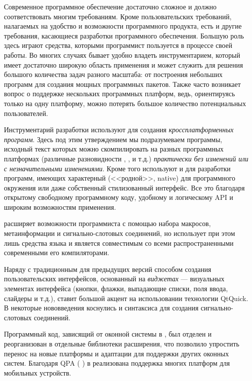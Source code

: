 Современное программное обеспечение достаточно сложное и должно соответствовать многим требованиям. 
Кроме пользовательских требований, налагаемых на удобство и возможности программного продукта, есть 
и другие требования, касающиеся разработки программного обеспечения. Большую роль здесь играют средства, 
которыми программист пользуется в
процессе своей работы. Во многих случаях бывает удобно владеть инструментарием, который имеет достаточно широкую
область применения и может служить для решения большого количества задач разного масштаба: от построения небольших
программ для создания мощных программных пакетов. Также часто возникает вопрос о поддержке нескольких программных
платформ, ведь, ориентируясь только на одну платформу, можно потерять большое количество потенциальных
пользователей.  

Инструментарий разработки  используют для создания \emph{кроссплатформенных программ}. Здесь под этим утверждением мы
подразумеваем программы, исходный текст которых  можно скомпилировать на разных
программных платформах (различные разновидности ,
,  и т.д.) \emph{практически без изменений или с незначительными изменениями}.
Кроме того  используют и для разработки программ, имеющих характерный
(<<родной>>, native) для программного окружения или даже собственный
стилизованный интерфейс. Все это благодаря открытому свободному программному коду, удобному и 
логическому API и широким возможностям применения.

 расширяет возможности программиста с помощью набора макросов, метаинформации и сигнально-слотовых
соединений, но использует при этом лишь средства языка  и является совместимым со всеми распространенными
современными его компиляторами. 

Наряду с традиционным для предыдущих версий  способом создания пользовательских интерфейсов, основанный
на \emph{виджетах} --- визуальных элементах интерфейса
(кнопки, флажки, выпадающие списки, поля ввода, слайдеры и т.д.),  ставит большой акцент на использовании технологии
QtQuick. В  некоторые нововведения коснулись и синтаксиса для создания сигнально-слотовых соединений.

Программный код, зависящий от оконной системы в , был отделен и реорганизован в отдельные библиотеки
расширения, что позволило упростить перенос  на новые платформы и адаптации для поддержки других оконных систем.
Благодаря QPA ( ) в  реализована поддержка многих платформ для мобильных устройств.

